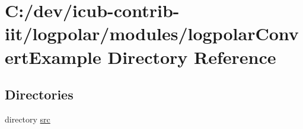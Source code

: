 \section{C\+:/dev/icub-\/contrib-\/iit/logpolar/modules/logpolar\+Convert\+Example Directory Reference}
\label{dir_2acae81d53fb0ec3db4f99aa97360f86}
\subsection*{Directories}
\begin{DoxyCompactItemize}
\item 
directory \hyperlink{dir_aefd5b7b3faf998ec447af4dcc51b0f6}{src}
\end{DoxyCompactItemize}

